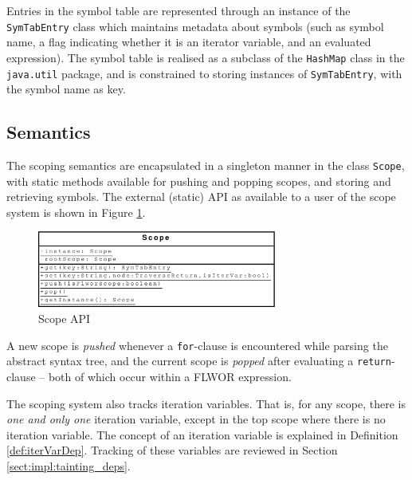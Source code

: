 Entries in the symbol table are represented through an instance of the
\texttt{SymTabEntry} class which maintains metadata about symbols (such as
symbol name, a flag indicating whether it is an iterator variable, and an
evaluated expression). The symbol table is realised as a subclass of the
\texttt{HashMap} class in the \texttt{java.util} package, and is constrained to
storing instances of \texttt{SymTabEntry}, with the symbol name as key.

\subsection{Semantics}
The scoping semantics are encapsulated in a singleton manner in the class
\texttt{Scope}, with static methods available for pushing and popping scopes,
and storing and retrieving symbols. The external (static) API as available to a
user of the scope system is shown in Figure \ref{fig:impl:scope_uml}.

\begin{figure}[!htp]
\begin{center}
  \includegraphics[width=0.7\textwidth]{diagrams/scope_uml}
  \caption{Scope API}
  \label{fig:impl:scope_uml}
\end{center}
\end{figure}

A new scope is \textit{pushed} whenever a \texttt{for}-clause is encountered while
parsing the abstract syntax tree, and the current scope is \textit{popped} after
evaluating a \texttt{return}-clause -- both of which occur within a FLWOR expression.

The scoping system also tracks iteration variables. That is, for any scope,
there is \textit{one and only one} iteration variable, except in the top scope
where there is no iteration variable. The concept of an iteration variable is
explained in Definition \ref{def:iterVarDep}. Tracking of these
variables are reviewed in Section \ref{sect:impl:tainting_deps}.